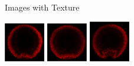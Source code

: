 \documentclass[10pt]{beamer}
\begin{document}
\begin{frame}{Images with Texture}

\def\imwidth{0.7in}

\begin{center}
\includegraphics[width=\imwidth]{nuclei2}
\hspace{0.2in}
\includegraphics[width=\imwidth]{nuclei3}
\hspace{0.2in}
\includegraphics[width=\imwidth]{nuclei4}

\end{center}
\end{frame}
\end{document}
